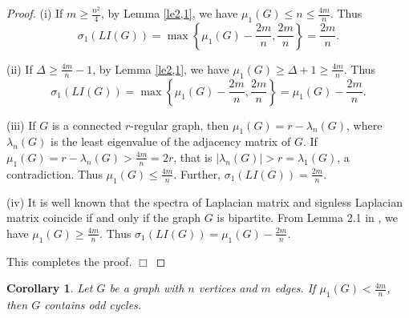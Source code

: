 \documentclass[12pt, a4paper]{article}
\newtheorem{corollary}[theorem]{Corollary}
\begin{document}
\begin{proof} (i) If $m\geq \frac{n^2}{4}$, by Lemma \ref{le2,1}, we have $\mu_1(G)\leq n\leq \frac{4m}{n}$. Thus
$$\sigma_1(LI(G))=\max\left\{\mu_1(G)-\frac{2m}{n},\frac{2m}{n}\right\}=\frac{2m}{n}.$$

(ii) If $\Delta\geq \frac{4m}{n}-1$, by Lemma \ref{le2,1}, we have $\mu_1(G)\geq \Delta+1\geq  \frac{4m}{n}$. Thus
$$\sigma_1(LI(G))=\max\left\{\mu_1(G)-\frac{2m}{n},\frac{2m}{n}\right\}=\mu_1(G)-\frac{2m}{n}.$$

(iii) If $G$ is a connected $r$-regular graph, then $\mu_1(G)=r-\lambda_n(G)$, where $\lambda_n(G)$ is the least eigenvalue of the adjacency matrix of $G$. If $\mu_1(G)=r-\lambda_n(G)>\frac{4m}{n}=2r$,
that is $|\lambda_n(G)|>r=\lambda_1(G)$, a contradiction. Thus $\mu_1(G)\leq \frac{4m}{n}$. Further, $\sigma_1(LI(G))=\frac{2m}{n}$.

(iv) It is well known that the spectra of Laplacian matrix and signless Laplacian matrix coincide if and only if the graph $G$ is bipartite. From Lemma 2.1 in \cite{NLL}, we have $\mu_1(G)\geq \frac{4m}{n}$. Thus $\sigma_1(LI(G))=\mu_1(G)-\frac{2m}{n}$.



This completes the proof. $\Box$
\end{proof}

\begin{corollary}\label{cor3,1} %
Let $G$ be a graph with $n$ vertices and $m$ edges. If $\mu_1(G)<\frac{4m}{n}$, then $G$ contains odd cycles.
\end{corollary}
\end{document}

